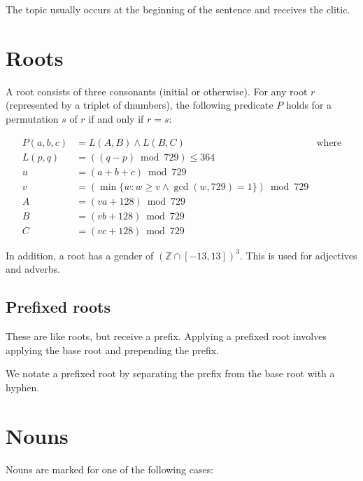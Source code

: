 \documentclass{book}
\begin{document}
The topic usually occurs at the beginning of the sentence and receives the  clitic.

\chapter{Roots}

A root consists of three consonants (initial or otherwise). For any root $r$ (represented by a triplet of dnumbers), the following predicate $P$ holds for a permutation $s$ of $r$ if and only if $r = s$:

\begin{align*}
  P(a, b, c) &= L(A, B) \land L(B, C) & \text{where} \\
  L(p, q) &= ((q - p) \bmod 729) \le 364 \\
  u &= (a + b + c) \bmod 729 \\
  v &= (\min \{ w : w \ge v \land \gcd(w, 729) = 1 \}) \bmod 729 \\
  A &= (va + 128) \bmod 729 \\
  B &= (vb + 128) \bmod 729 \\
  C &= (vc + 128) \bmod 729
\end{align*}

In addition, a root has a gender of $(\mathbb{Z} \cap [-13, 13])^3$. This is used for adjectives and adverbs.

\section{Prefixed roots}

These are like roots, but receive a prefix. Applying a prefixed root involves applying the base root and prepending the prefix.

We notate a prefixed root by separating the prefix from the base root with a hyphen.

\chapter{Nouns}

Nouns are marked for one of the following cases:
\end{document}
